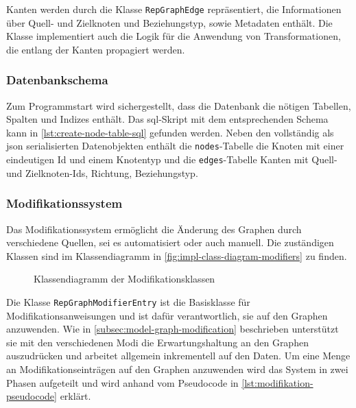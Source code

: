 Kanten werden durch die Klasse \texttt{RepGraphEdge} repräsentiert, die Informationen über Quell- und Zielknoten und Beziehungstyp, sowie Metadaten enthält.
Die Klasse implementiert auch die Logik für die Anwendung von Transformationen, die entlang der Kanten propagiert werden.


\subsubsection{Datenbankschema}

Zum Programmstart wird sichergestellt, dass die Datenbank die nötigen Tabellen, Spalten und Indizes enthält.
Das \acrshort{sql}-Skript mit dem entsprechenden Schema kann in \autoref{lst:create-node-table-sql} gefunden werden.
Neben den vollständig als \acrshort{json} serialisierten Datenobjekten enthält die \texttt{nodes}-Tabelle die Knoten mit einer eindeutigen Id und einem Knotentyp und die \texttt{edges}-Tabelle Kanten mit Quell- und Zielknoten-Ids, Richtung, Beziehungstyp.



\subsubsection{Modifikationssystem}

Das Modifikationssystem ermöglicht die Änderung des Graphen durch verschiedene Quellen, sei es automatisiert oder auch manuell.
Die zuständigen Klassen sind im Klassendiagramm in \autoref{fig:impl-class-diagram-modifiers} zu finden.

\begin{figure}[htbp]
    \centering
    \makebox[\textwidth]{}
    \caption{Klassendiagramm der Modifikationsklassen}
    \label{fig:impl-class-diagram-modifiers}
\end{figure}

Die Klasse \texttt{RepGraphModifierEntry} ist die Basisklasse für Modifikationsanweisungen und ist dafür verantwortlich, sie auf den Graphen anzuwenden.
Wie in \autoref{subsec:model-graph-modification} beschrieben unterstützt sie mit den verschiedenen Modi die Erwartungshaltung an den Graphen auszudrücken und arbeitet allgemein inkrementell auf den Daten.
Um eine Menge an Modifikationseinträgen auf den Graphen anzuwenden wird das System in zwei Phasen aufgeteilt und wird anhand vom Pseudocode in \autoref{lst:modifikation-pseudocode} erklärt.

